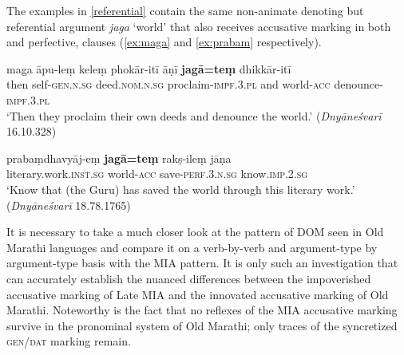 \documentclass[output=paper,
modfonts
]{LSP/langsci}
\begin{document}
 The examples in \cref{referential} contain the same non-animate denoting but referential argument \textit{jaga} `world'  that also receives accusative marking in both  and perfective,  clauses (\cref{ex:maga} and \cref{ex:prabam} respectively). 
 
\begin{exe}
	\ex\label{referential} 
	\begin{xlist}
	\ex\label{ex:maga}\gll maga āpu-leṃ keleṃ phokār-itī āṇī  \textbf{jagā=teṃ} dhikkār-itī  \\
	then self-\textsc{gen.n.sg} deed.\textsc{nom.n.sg} proclaim-\textsc{impf.3.pl} and world-\textsc{acc} denounce-\textsc{impf.3.pl} \\
	\glt `Then they proclaim their own deeds and denounce the world.' (\textit{Dnyāneśvarī} 16.10.328)
	
	\ex\label{ex:prabam}\gll prabaṃdhavyāj-eṃ \textbf{jagā=teṃ}
rakṣ-ileṃ jāṇa \\
literary.work.\textsc{inst.sg} world-\textsc{acc} save-\textsc{perf.3.n.sg} know.\textsc{imp.2.sg} \\
\glt `Know that (the Guru) has saved the world through this literary work.'  (\textit{Dnyāneśvarī} 18.78.1765)
\end{xlist}
\end{exe}

 It is necessary to take a much closer  look at the pattern of DOM seen in Old Marathi  languages and compare it on a verb-by-verb and argument-type by argument-type basis with the MIA pattern. It is only such an investigation that can accurately establish the nuanced differences   between the impoverished accusative marking of Late MIA and the innovated accusative marking of  Old Marathi. Noteworthy is the fact that no reflexes of the MIA accusative marking survive in  the pronominal system  of Old Marathi; only traces of the syncretized \textsc{gen/dat} marking remain.
 

 
\end{document}
